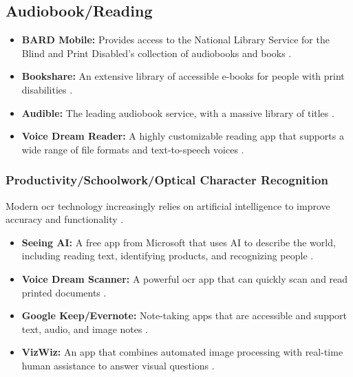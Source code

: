 \subsection{Audiobook/Reading}\label{ch2:ssec:reading-apps}
\begin{itemize}
	\item \textbf{BARD Mobile:} Provides access to the National Library Service for the Blind and Print Disabled's collection of audiobooks and  books \supercite{BARDMobile}.
	\item \textbf{Bookshare:} An extensive library of accessible e-books for people with print disabilities \supercite{Bookshare}.
	\item \textbf{Audible:} The leading audiobook service, with a massive library of titles \supercite{Audible}.
	\item \textbf{Voice Dream Reader:} A highly customizable reading app that supports a wide range of file formats and text-to-speech voices \supercite{VoiceDreamReader}.
\end{itemize}

\subsubsection{Productivity/Schoolwork/Optical Character Recognition}\label{ch2:sssec:ocr-apps}
Modern \gls{ocr} technology increasingly relies on artificial intelligence to improve accuracy and functionality \supercite{ABBYYAIOCR}.
\begin{itemize}
	\item \textbf{Seeing AI:} A free app from Microsoft that uses AI to describe the world, including reading text, identifying products, and recognizing people \supercite{SeeingAI}.
	\item \textbf{Voice Dream Scanner:} A powerful \gls{ocr} app that can quickly scan and read printed documents \supercite{VoiceDreamScanner}.
	\item \textbf{Google Keep/Evernote:} Note-taking apps that are accessible and support text, audio, and image notes \supercite{GoogleKeep}.
	\item \textbf{VizWiz:} An app that combines automated image processing with real-time human assistance to answer visual questions \supercite{Bigham2014}.
\end{itemize}

